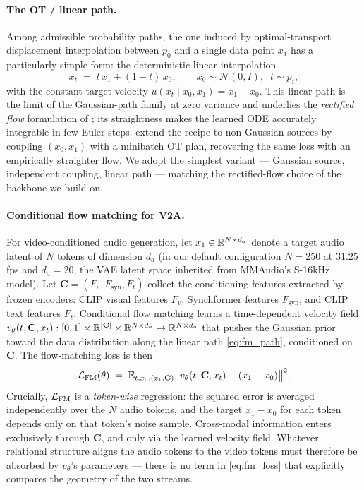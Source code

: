 \paragraph{The OT / linear path.}
Among admissible probability paths, the one induced by
optimal-transport displacement interpolation between $p_0$ and a
single data point $x_1$ has a particularly simple form: the
deterministic linear interpolation
\begin{equation}
  x_t \;=\; t\,x_1 + (1-t)\,x_0,
  \qquad x_0 \sim \mathcal{N}(0, I), \;\; t \sim p_t,
  \label{eq:fm_path}
\end{equation}
with the constant target velocity
$u(x_t \mid x_0, x_1) = x_1 - x_0$. This linear path is the limit
of the Gaussian-path family at zero variance and underlies the
\emph{rectified flow} formulation of \citet{liu_2023_rectified};
its straightness makes the learned ODE accurately integrable in
few Euler steps. \citet{tong_2024_improving} extend the recipe to
non-Gaussian sources by coupling $(x_0, x_1)$ with a minibatch OT
plan, recovering the same loss with an empirically straighter
flow. We adopt the simplest variant — Gaussian source, independent
coupling, linear path — matching the rectified-flow choice of the
backbone we build on.

\paragraph{Conditional flow matching for V2A.}
For video-conditioned audio generation, let
$x_1 \in \mathbb{R}^{N \times d_a}$ denote a target audio latent of $N$
tokens of dimension $d_a$ (in our default configuration $N=250$ at
$31.25$ fps and $d_a=20$, the VAE latent space inherited from
MMAudio's S-16kHz model). Let
$\mathbf{C} = (F_v, F_{\mathrm{syn}}, F_t)$ collect the conditioning
features extracted by frozen encoders: CLIP visual features $F_v$,
Synchformer features $F_{\mathrm{syn}}$, and CLIP text features
$F_t$. Conditional flow matching learns a time-dependent velocity
field
$v_\theta(t, \mathbf{C}, x_t) : [0,1] \times \mathbb{R}^{|\mathbf{C}|}
\times \mathbb{R}^{N\times d_a} \to \mathbb{R}^{N \times d_a}$
that pushes the Gaussian prior toward the data distribution along
the linear path \eqref{eq:fm_path}, conditioned on $\mathbf{C}$.
The flow-matching loss is then
\begin{equation}
  \mathcal{L}_{\mathrm{FM}}(\theta)
  \;=\;
  \mathbb{E}_{t, x_0, (x_1, \mathbf{C})}
  \bigl\lVert v_\theta(t, \mathbf{C}, x_t) - (x_1 - x_0) \bigr\rVert^{2}.
  \label{eq:fm_loss}
\end{equation}
Crucially, $\mathcal{L}_{\mathrm{FM}}$ is a \emph{token-wise} regression: the squared
error is averaged independently over the $N$ audio tokens, and the
target $x_1 - x_0$ for each token depends only on that token's
noise sample. Cross-modal information enters exclusively through
$\mathbf{C}$, and only via the learned velocity field. Whatever
relational structure aligns the audio tokens to the video tokens
must therefore be absorbed by $v_\theta$'s parameters --- there is
no term in \eqref{eq:fm_loss} that explicitly compares the geometry
of the two streams.

